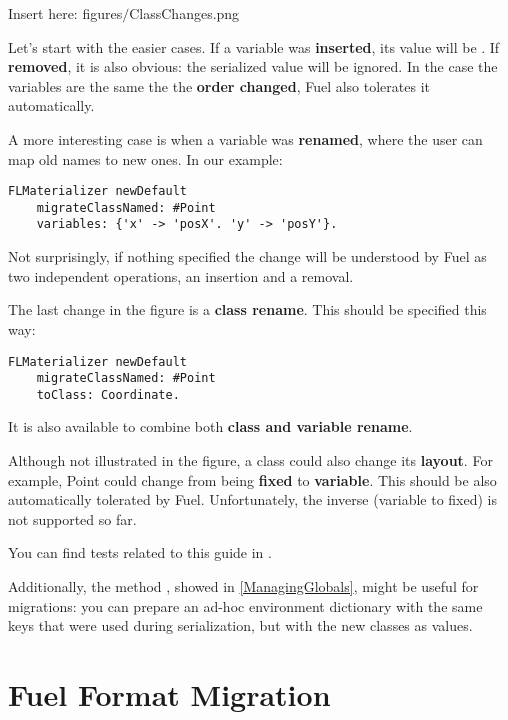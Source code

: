 \documentclass[a4paper,10pt,twoside]{book}
\begin{document}
\begin{todo}
Insert here: figures$/$ClassChanges.png
\end{todo}

Let's start with the easier cases. If a variable was \textbf{inserted}, its value will be . If \textbf{removed}, it is also obvious: the serialized value will be ignored. In the case the variables are the same the the \textbf{order changed}, Fuel also tolerates it automatically.

A more interesting case is when a variable was \textbf{renamed}, where the user can map old names to new ones. In our example:

\begin{lstlisting}
FLMaterializer newDefault
	migrateClassNamed: #Point
	variables: {'x' -> 'posX'. 'y' -> 'posY'}.
\end{lstlisting}

Not surprisingly, if nothing specified the change will be understood by Fuel as two independent operations, an insertion and a removal.

The last change in the figure is a \textbf{class rename}. This should be specified this way:

\begin{lstlisting}
FLMaterializer newDefault
	migrateClassNamed: #Point
	toClass: Coordinate.
\end{lstlisting}

It is also available  to combine both \textbf{class and variable rename}.

Although not illustrated in the figure, a class could also change its \textbf{layout}. For example, Point could change from being \textbf{fixed} to \textbf{variable}. This should be also automatically tolerated by Fuel. Unfortunately, the inverse (variable to fixed) is not supported so far.

You can find tests related to this guide in .

Additionally, the method , showed in \ref{ManagingGlobals}, might be useful for migrations: you can prepare an ad-hoc environment dictionary with the same keys that were used during serialization, but with the new classes as values.



\section{Fuel Format Migration}
\end{document}
